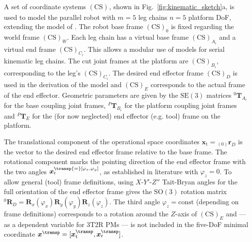 \documentclass[
	graybox,
	vecphys] %
	{svmult}
\newcommand{\bm}[1]{\boldsymbol{#1}}
\newcommand{\ks}[1]{{(\mathrm{CS})}_{#1}}
\newcommand{\ortvek}[4]{{ }_{(#1)}{\boldsymbol{#2}}^{#3}_{#4} }
\newcommand{\trmat}[2]{{{ }^{#1}\boldsymbol{T}}_{#2}}
\newcommand{\rotmat}[2]{{{ }^{#1}\boldsymbol{R}}_{#2}}
\begin{document}
A set of coordinate systems $\ks{}$, shown in Fig.~\ref{fig:kinematic_sketch}a, is used to model the parallel robot with $m{=}5$ leg chains $n{=}5$ platform DoF, extending the model of \cite{BriotKha2015}.
The robot base frame $\ks{0}$ is fixed regarding the world frame $\ks{W}$.
Each leg chain has a virtual base frame $\ks{A_i}$ and a virtual end frame $\ks{C_i}$.
This allows a modular use of models for serial kinematic leg chains.
The cut joint frames at the platform are $\ks{B_i}$, corresponding to the leg's $\ks{C_i}$.
The desired end effector frame $\ks{D}$ is used in the derivation of the model and $\ks{E}$ corresponds to the actual frame of the end effector.
Geometric parameters are given by the $\mathrm{SE}(3)$ matrices $\trmat{0}{A_i}$ for the base coupling joint frames, $\trmat{P}{B_i}$ for the platform coupling joint frames and $\trmat{P}{E}$ for the (for now neglected) end effector (e.g. tool) frame on the platform.

The translational component of the operational space coordinates $\bm{x}_{\mathrm{t}}{=}\ortvek{0}{r}{}{D}$ is the vector to the desired end effector frame relative to the base frame.
The rotational component marks the pointing direction of the end effector frame with the two angles $\bm{x}_{\mathrm{r}}^\transp{=}[\varphi_x,\varphi_y]$, as established in literature \cite{MotevalliZohSoh2010,MasoulehSaaGosTag2010,AmineMasCarWen2012,SongLiaSunDon2014,GallardoAlvaradoAbeIsl2019} with $\varphi_z{=}0$.
To allow general (tool) frame definitions, using $X$-$Y'$-$Z''$ Tait-Bryan angles for the full orientation of the end effector frame gives the $\mathrm{SO(3)}$ rotation matrix $\rotmat{0}{D} {=} \bm{R}_x(\varphi_x) \bm{R}_y(\varphi_y) \bm{R}_z(\varphi_z)$.
The third angle $\varphi_z{=}\mathrm{const}$ (depending on frame definitions) corresponds to a rotation around the $Z$-axis of $\ks{E}$ and --- as a dependent variable for 3T2R PMs --- is not included in the five-DoF minimal coordinate $\bm{x}^\transp=[\bm{x}_\mathrm{t}^\transp,\bm{x}_\mathrm{r}^\transp]$. %
\end{document}
